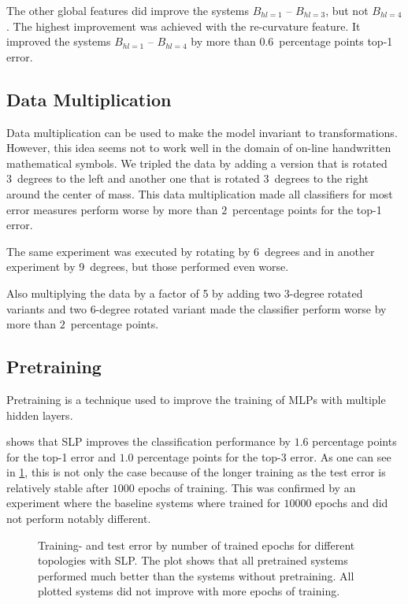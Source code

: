 The other global features did improve the systems $B_{hl=1}$ -- $B_{hl=3}$, but not
$B_{hl=4}$. The highest improvement was achieved with the re-curvature feature. It
improved the systems $B_{hl=1}$ -- $B_{hl=4}$ by more than $\num{0.6}$~percentage points
top-1 error.


\subsection{Data Multiplication}
Data multiplication can be used to make the model invariant to transformations.
However, this idea seems not to work well in the domain of on-line handwritten
mathematical symbols. We tripled the data by adding a version that is rotated
3~degrees to the left and another one that is rotated 3~degrees to the right
around the center of mass. This data multiplication made all classifiers for
most error measures perform worse by more than $\num{2}$~percentage points for
the top-1 error.

The same experiment was executed by rotating by 6~degrees and in another
experiment by 9~degrees, but those performed even worse.

Also multiplying the data by a factor of 5 by adding two 3-degree rotated
variants and two 6-degree rotated variant made the classifier perform worse
by more than $\num{2}$~percentage points.


\subsection{Pretraining}\label{subsec:pretraining-evaluation}
Pretraining is a technique used to improve the training of \glspl{MLP} with
multiple hidden layers.

 shows that \gls{SLP} improves the classification
performance by $\num{1.6}$ percentage points for the top-1 error and
$\num{1.0}$ percentage points for the top-3 error. As one can see in
\cref{fig:training-and-test-error-for-different-topologies-pretraining}, this
is not only the case because of the longer training as the test error is
relatively stable after $\num{1000}$ epochs of training. This was confirmed
by an experiment where the baseline systems where trained for $\num{10000}$
epochs and did not perform notably different.

\begin{figure}[htb]
    \centering
    
    \caption{Training- and test error by number of trained epochs for different
             topologies with \acrfull{SLP}. The plot shows
             that all pretrained systems performed much better than the systems
             without pretraining. All plotted systems did not improve
             with more epochs of training.}
\label{fig:training-and-test-error-for-different-topologies-pretraining}
\end{figure}

